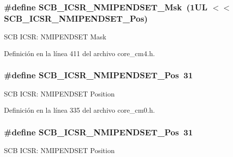 \subsubsection[{\texorpdfstring{S\+C\+B\+\_\+\+I\+C\+S\+R\+\_\+\+N\+M\+I\+P\+E\+N\+D\+S\+E\+T\+\_\+\+Msk}{SCB_ICSR_NMIPENDSET_Msk}}]{\setlength{\rightskip}{0pt plus 5cm}\#define S\+C\+B\+\_\+\+I\+C\+S\+R\+\_\+\+N\+M\+I\+P\+E\+N\+D\+S\+E\+T\+\_\+\+Msk~(1\+U\+L $<$$<$ S\+C\+B\+\_\+\+I\+C\+S\+R\+\_\+\+N\+M\+I\+P\+E\+N\+D\+S\+E\+T\+\_\+\+Pos)}\hypertarget{group___c_m_s_i_s___s_c_b_ga340e3f79e9c3607dee9f2c048b6b22e8}{}\label{group___c_m_s_i_s___s_c_b_ga340e3f79e9c3607dee9f2c048b6b22e8}
S\+CB I\+C\+SR\+: N\+M\+I\+P\+E\+N\+D\+S\+ET Mask 

Definición en la línea 411 del archivo core\+\_\+cm4.\+h.

\subsubsection[{\texorpdfstring{S\+C\+B\+\_\+\+I\+C\+S\+R\+\_\+\+N\+M\+I\+P\+E\+N\+D\+S\+E\+T\+\_\+\+Pos}{SCB_ICSR_NMIPENDSET_Pos}}]{\setlength{\rightskip}{0pt plus 5cm}\#define S\+C\+B\+\_\+\+I\+C\+S\+R\+\_\+\+N\+M\+I\+P\+E\+N\+D\+S\+E\+T\+\_\+\+Pos~31}\hypertarget{group___c_m_s_i_s___s_c_b_ga750d4b52624a46d71356db4ea769573b}{}\label{group___c_m_s_i_s___s_c_b_ga750d4b52624a46d71356db4ea769573b}
S\+CB I\+C\+SR\+: N\+M\+I\+P\+E\+N\+D\+S\+ET Position 

Definición en la línea 335 del archivo core\+\_\+cm0.\+h.

\subsubsection[{\texorpdfstring{S\+C\+B\+\_\+\+I\+C\+S\+R\+\_\+\+N\+M\+I\+P\+E\+N\+D\+S\+E\+T\+\_\+\+Pos}{SCB_ICSR_NMIPENDSET_Pos}}]{\setlength{\rightskip}{0pt plus 5cm}\#define S\+C\+B\+\_\+\+I\+C\+S\+R\+\_\+\+N\+M\+I\+P\+E\+N\+D\+S\+E\+T\+\_\+\+Pos~31}\hypertarget{group___c_m_s_i_s___s_c_b_ga750d4b52624a46d71356db4ea769573b}{}\label{group___c_m_s_i_s___s_c_b_ga750d4b52624a46d71356db4ea769573b}
S\+CB I\+C\+SR\+: N\+M\+I\+P\+E\+N\+D\+S\+ET Position 

